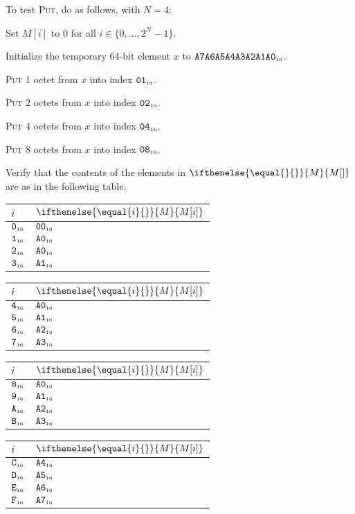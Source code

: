 \documentclass[a4paper,12pt]{article}
\makeatletter
\newcommand{\num}[1]{\texttt{#1}}
\newcommand{\hex}[1]{\num{#1}_{\textup{\tiny 16}}}
\newcommand{\MEM}[1]{\ifthenelse{\equal{#1}{}}{M}{M[#1]}}
\newcommand{\range}[2]{\{#1,\ldots,#2\}}
\newcommand{\proc}[1]{\textsc{#1}}
\newenvironment{memtable}{%
  \begin{trivlist}
    \item
    }{%
    \end{trivlist}}
\newenvironment{memcolumn}{%
  \begin{tabular}{@{}ll@{}}
    $i$ & $\MEM{i}$ \\
    \hline}
    {%
    \hline
  \end{tabular}}
\newcommand{\memspace}{\qquad}
\makeatother
\begin{document}
To test \proc{Put}, do as follows, with $N=4$:
\begin{stepnumbers}
\item Set $M[i]$ to 0 for all $i \in \range{0}{2^N-1}$.
\item Initialize the temporary 64-bit element $x$ to $\hex{A7A6A5A4A3A2A1A0}$.
\item \proc{Put} 1 octet  from $x$ into index $\hex{01}$.
\item \proc{Put} 2 octets from $x$ into index $\hex{02}$.
\item \proc{Put} 4 octets from $x$ into index $\hex{04}$.
\item \proc{Put} 8 octets from $x$ into index $\hex{08}$.
\item Verify that the contents of the elements in $\MEM{}$ are as in the following table.
\end{stepnumbers}

\begin{memtable}
  \begin{memcolumn}
    $\hex{0}$ & $\hex{00}$ \\
    $\hex{1}$ & $\hex{A0}$ \\
    $\hex{2}$ & $\hex{A0}$ \\
    $\hex{3}$ & $\hex{A1}$ \\
  \end{memcolumn}
  \memspace
  \begin{memcolumn}
    $\hex{4}$ & $\hex{A0}$ \\
    $\hex{5}$ & $\hex{A1}$ \\
    $\hex{6}$ & $\hex{A2}$ \\
    $\hex{7}$ & $\hex{A3}$ \\
  \end{memcolumn}
  \memspace
  \begin{memcolumn}
    $\hex{8}$ & $\hex{A0}$ \\
    $\hex{9}$ & $\hex{A1}$ \\
    $\hex{A}$ & $\hex{A2}$ \\
    $\hex{B}$ & $\hex{A3}$ \\
  \end{memcolumn}
  \memspace
  \begin{memcolumn}
    $\hex{C}$ & $\hex{A4}$ \\
    $\hex{D}$ & $\hex{A5}$ \\
    $\hex{E}$ & $\hex{A6}$ \\
    $\hex{F}$ & $\hex{A7}$ \\
  \end{memcolumn}
\end{memtable}
\end{document}
